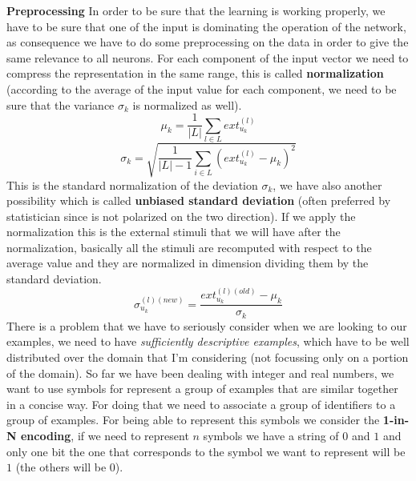 \documentclass{article}
\begin{document}
\noindent\newline\textbf{Preprocessing}\newline
In order to be sure that the learning is working properly, we have to be sure
that one of the input is dominating the operation of the network, as consequence
we have to do some preprocessing on the data in order to give the same relevance
to all neurons.
\newline\newline
For each component of the input vector we need to compress the representation
in the same range, this is called \textbf{normalization} (according to the
average of the input value for each component, we need to be sure that
the variance $\sigma_k$ is normalized as well).
$$\mu_k =\frac{1}{|L|}\sum_{l\in L}ext_{u_k}^{(l)}$$
$$\sigma_k =\sqrt{\frac{1}{|L|-1}\sum_{i\in L}\left(ext_{u_k}^{(l)}-\mu_k\right)^2}$$
This is the standard normalization of the deviation $\sigma_k$, we have also another
possibility which is called \textbf{unbiased standard deviation} (often preferred
by statistician since is not polarized on the two direction).
\newline\newline
If we apply the normalization this is the external stimuli that we will have after
the normalization, basically all the stimuli are recomputed with respect to the
average value and they are normalized in dimension dividing them by the standard
deviation.
$$\sigma_{u_k}^{(l)(new)}=\frac{ext_{u_k}^{(l)(old)}-\mu_k}{\sigma_k}$$
There is a problem that we have to seriously consider when we are looking
to our examples, we need to have \textit{sufficiently descriptive examples},
which have to be well distributed over the domain that I'm considering (not
focussing only on a portion of the domain).
\newline\newline
So far we have been dealing with integer and real numbers, we want to use
symbols for represent a group of examples that are similar together in a concise way.
\newline\newline
For doing that we need to associate a group of identifiers to a group of examples. For
being able to represent this symbols we consider the \textbf{1-in-N encoding}, if
we need to represent $n$ symbols we have a string of $0$ and $1$ and only one bit the one
that corresponds to the symbol we want to represent will be $1$ (the others will be $0$).
\end{document}
